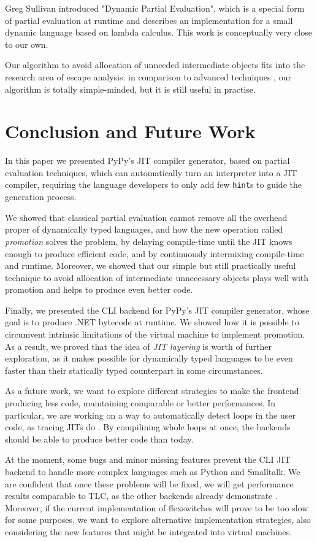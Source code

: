 Greg Sullivan introduced "Dynamic Partial Evaluation", which is a special
form of partial evaluation at runtime \cite{sullivan_dynamic_2001} and describes
an implementation for a small dynamic language based on lambda calculus. This
work is conceptually very close to our own.

Our algorithm to avoid allocation of unneeded intermediate objects fits into
the research area of escape analysis: in comparison to advanced techniques
\cite{Blanchet99escapeanalysis}, \cite{Choi99escapeanalysis} our algorithm is
totally simple-minded, but it is still useful in practise.

\section{Conclusion and Future Work}

In this paper we presented PyPy's JIT compiler generator, based on partial
evaluation techniques, which can automatically turn an interpreter into a JIT
compiler, requiring the language developers to only add few \texttt{hint}s to
guide the generation process.

We showed that classical partial evaluation cannot remove all the overhead
proper of dynamically typed languages, and how the new operation called
\emph{promotion} solves the problem, by delaying compile-time until the JIT
knows enough to produce efficient code, and by continuously intermixing
compile-time and runtime.  Moreover, we showed that our simple but still
practically useful technique to avoid allocation of intermediate unnecessary
objects plays well with promotion and helps to produce even better code.

Finally, we presented the CLI backend for PyPy's JIT compiler generator, whose
goal is to produce .NET bytecode at runtime.  We showed how it is possible to
circumvent intrinsic limitations of the virtual machine to implement
promotion.  As a result, we proved that the idea of \emph{JIT layering} is
worth of further exploration, as it makes possible for dynamically typed
languages to be even faster than their statically typed counterpart in some
circumstances.

As a future work, we want to explore different strategies to make the frontend
producing less code, maintaining comparable or better performances.  In
particular, we are working on a way to automatically detect loops in the user
code, as tracing JITs do \cite{gal_hotpathvm_2006}.  By compilining whole
loops at once, the backends should be able to produce better code than today.

At the moment, some bugs and minor missing features prevent the CLI JIT
backend to handle more complex languages such as Python and Smalltalk.  We are
confident that once these problems will be fixed, we will get performance
results comparable to TLC, as the other backends already demonstrate
\cite{PyPyJIT}.  Moreover, if the current implementation of flexswitches will
prove to be too slow for some purposes, we want to explore alternative
implementation strategies, also considering the new features that might be
integrated into virtual machines.

